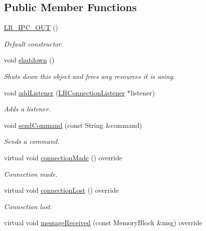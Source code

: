 \subsection*{Public Member Functions}
\begin{DoxyCompactItemize}
\item 
\hyperlink{class_l_r___i_p_c___o_u_t_a8842e5b48f3546b6269607aec979f916}{L\+R\+\_\+\+I\+P\+C\+\_\+\+O\+UT} ()
\begin{DoxyCompactList}\small\item\em Default constructor. \end{DoxyCompactList}\item 
void \hyperlink{class_l_r___i_p_c___o_u_t_a3a88e19600489b202fa50e4c10fcdcba}{shutdown} ()
\begin{DoxyCompactList}\small\item\em Shuts down this object and frees any resources it is using. \end{DoxyCompactList}\item 
void \hyperlink{class_l_r___i_p_c___o_u_t_adbfa161730bad89c9e761cf60b6909ad}{add\+Listener} (\hyperlink{class_l_r_connection_listener}{L\+R\+Connection\+Listener} $\ast$listener)
\begin{DoxyCompactList}\small\item\em Adds a listener. \end{DoxyCompactList}\item 
void \hyperlink{class_l_r___i_p_c___o_u_t_ad59cf75d5fef641f40adc9a354f584ff}{send\+Command} (const String \&command)
\begin{DoxyCompactList}\small\item\em Sends a command. \end{DoxyCompactList}\item 
virtual void \hyperlink{class_l_r___i_p_c___o_u_t_a4711a84655cbcdd923ce8f271109941e}{connection\+Made} () override
\begin{DoxyCompactList}\small\item\em Connection made. \end{DoxyCompactList}\item 
virtual void \hyperlink{class_l_r___i_p_c___o_u_t_a83d07e7eb695c511a5bcaa16341488f4}{connection\+Lost} () override
\begin{DoxyCompactList}\small\item\em Connection lost. \end{DoxyCompactList}\item 
virtual void \hyperlink{class_l_r___i_p_c___o_u_t_a7fcdee71f2811557b6bf4d1a6c8f243a}{message\+Received} (const Memory\+Block \&msg) override

\end{DoxyCompactItemize}
